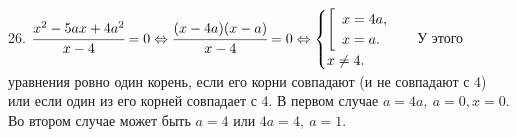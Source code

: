 26. $\cfrac{x^2-5ax+4a^2}{x-4}=0\Leftrightarrow\cfrac{(x-4a)(x-a)}{x-4}=0\Leftrightarrow\begin{cases}\left[\begin{array}{l}x=4a,\\ x=a.\end{array}\right.\\x\neq4.\end{cases}$ У этого уравнения ровно один корень, если его корни совпадают (и не совпадают с 4) или если один из его корней совпадает с 4. В первом случае $a=4a,\ a=0, x=0.$ Во втором случае может быть $a=4$ или $4a=4,\ a=1.$\\
